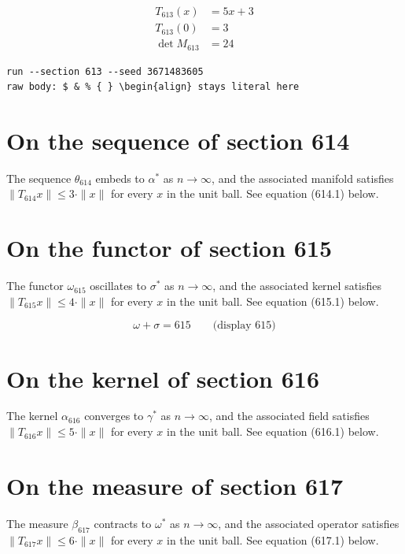 \documentclass{article}
\begin{document}
\begin{align}
T_{613}(x) &= 5 x + 3 \\
T_{613}(0) &= 3 \\
\det M_{613} &= 24
\end{align}

\begin{verbatim}
run --section 613 --seed 3671483605
raw body: $ & % { } \begin{align} stays literal here
\end{verbatim}

\section{On the sequence of section 614}
The sequence $\theta_{614}$ embeds to $\alpha^{*}$ as $n \to \infty$,
and the associated manifold satisfies $\|T_{614} x\| \leq 3 \cdot \|x\|$
for every $x$ in the unit ball. See equation (614.1) below.

\section{On the functor of section 615}
The functor $\omega_{615}$ oscillates to $\sigma^{*}$ as $n \to \infty$,
and the associated kernel satisfies $\|T_{615} x\| \leq 4 \cdot \|x\|$
for every $x$ in the unit ball. See equation (615.1) below.

$$
\omega + \sigma = 615 \qquad \text{(display 615)}
$$

\section{On the kernel of section 616}
The kernel $\alpha_{616}$ converges to $\gamma^{*}$ as $n \to \infty$,
and the associated field satisfies $\|T_{616} x\| \leq 5 \cdot \|x\|$
for every $x$ in the unit ball. See equation (616.1) below.

\section{On the measure of section 617}
The measure $\beta_{617}$ contracts to $\omega^{*}$ as $n \to \infty$,
and the associated operator satisfies $\|T_{617} x\| \leq 6 \cdot \|x\|$
for every $x$ in the unit ball. See equation (617.1) below.
\end{document}

